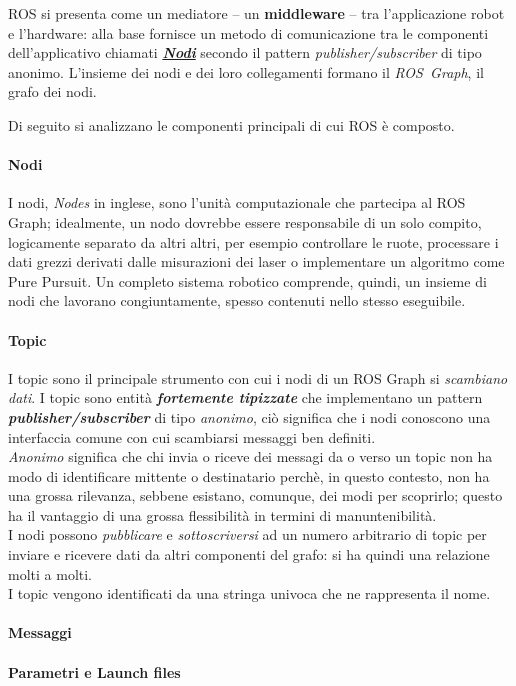ROS si presenta come un mediatore -- un \textbf{middleware} -- tra l'applicazione robot e l'hardware:
alla base fornisce un metodo di comunicazione tra le componenti dell'applicativo chiamati
\hyperref[ros:nodes]{\textbf{\textit{Nodi}}} secondo il pattern \textit{publisher/subscriber} di tipo anonimo.
L'insieme dei nodi e dei loro collegamenti formano il \textit{ROS~Graph}, il grafo dei nodi.
\bigskip

\noindent Di seguito si analizzano le componenti principali di cui ROS è composto.

\paragraph{Nodi}
\label{ros:nodes}
I nodi, \textit{Nodes} in inglese, sono l'unità computazionale che partecipa al ROS Graph;
idealmente, un nodo dovrebbe essere responsabile di un solo compito, logicamente separato
da altri altri, per esempio controllare le ruote, processare i dati grezzi derivati dalle misurazioni
dei laser o implementare un algoritmo come Pure Pursuit.
Un completo sistema robotico comprende, quindi, un insieme di nodi che lavorano congiuntamente, spesso
contenuti nello stesso eseguibile.

\paragraph{Topic}
\label{ros:topics}
I topic sono il principale strumento con cui i nodi di un ROS Graph si \textit{scambiano dati}.
I topic sono entità \textbf{\textit{fortemente tipizzate}} che implementano
un pattern \textbf{\textit{publisher/subscriber}} di tipo \textit{anonimo}, ciò significa
che i nodi conoscono una interfaccia comune con cui scambiarsi messaggi ben definiti.\\
\textit{Anonimo} significa che chi invia o riceve dei messagi da o verso un topic
non ha modo di identificare mittente o destinatario perchè, in questo contesto, non ha una grossa rilevanza,
sebbene esistano, comunque, dei modi per scoprirlo; questo ha il vantaggio di una grossa
flessibilità in termini di manuntenibilità.\\
I nodi possono \textit{pubblicare} e \textit{sottoscriversi} ad un numero arbitrario di topic
per inviare e ricevere dati da altri componenti del grafo: si ha quindi una relazione molti a molti.\\
I topic vengono identificati da una stringa univoca che ne rappresenta il nome.

\paragraph{Messaggi}

\paragraph{Parametri e Launch files}


